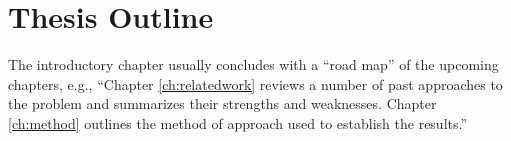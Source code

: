 
\section{Thesis Outline}\label{sec:outline}
The introductory chapter usually concludes with a ``road map'' of the upcoming
chapters, e.g., ``Chapter \ref{ch:relatedwork} reviews a number of past approaches
to the problem and summarizes their strengths and weaknesses. Chapter 
\ref{ch:method} outlines the method of approach used to establish the
results.''

